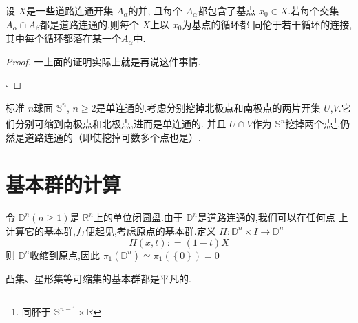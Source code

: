 \documentclass[../../几何与拓扑.tex]{subfiles}
\begin{document}
\begin{corollary}
    设 \(  X  \)是一些道路连通开集 \(  A_{\alpha }  \)的并, 且每个 \(  A_{\alpha }  \)都包含了基点 \(  x_0 \in X  \).若每个交集 \(  A_{\alpha }\cap A_{\beta }  \)都是道路连通的,则每个 \(  X  \)上以 \(  x_0  \)为基点的循环都 同伦于若干循环的连接,其中每个循环都落在某一个\(  A_ \alpha   \)中.   
\end{corollary}
\begin{proof}
    一上面的证明实际上就是再说这件事情.

    \hfill $\square$
\end{proof}
\begin{example}
    标准 \(  n  \)球面 \(  \mathbb{S}^{n}  \), \(  n\ge 2  \)是单连通的.考虑分别挖掉北极点和南极点的两片开集 \(  U  \),\(  V  \).它们分别可缩到南极点和北极点,进而是单连通的.
    并且 \(  U\cap V  \)作为 \(  \mathbb{S}^{n}  \)挖掉两个点\footnote{同肧于 \(  \mathbb{S}^{n-1}\times \mathbb{R}   \) },仍然是道路连通的（即使挖掉可数多个点也是）.       
\end{example}

\hspace*{\fill} 

\section{基本群的计算}

\begin{example}
    令 \(  \mathbb{D}^{n}\left( n\ge 1 \right)   \)是 \(  \mathbb{R} ^{n}  \)上的单位闭圆盘.由于 \(  \mathbb{D}^{n}  \)是道路连通的,我们可以在任何点
    上计算它的基本群,方便起见,考虑原点的基本群.定义 \(  H: \mathbb{D}^{n}\times I\to \mathbb{D}^{n}  \) \[
    H\left( x,t \right): =  \left( 1-t \right)X  
    \]    则 \(  \mathbb{D}^{n}  \)收缩到原点,因此 \(  \pi _1 \left( \mathbb{D}^{n} \right)\simeq \pi _1 \left( \left\{ 0 \right\} \right)= 0    \)  
\end{example}


\begin{remark}
    凸集、星形集等可缩集的基本群都是平凡的.
\end{remark}
\hspace*{\fill} 
\end{document}
